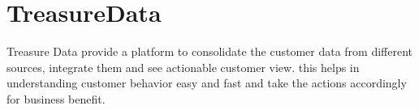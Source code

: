 \section{TreasureData}

Treasure Data provide a platform to consolidate the customer data from different sources, integrate them and see actionable customer view. this helps in understanding customer behavior easy and fast and take the actions accordingly for business benefit\cites{hid-sp18-511-treasuredata}.

